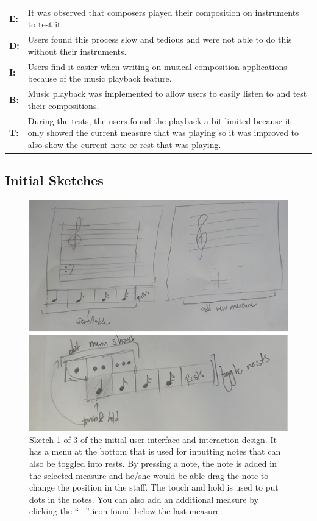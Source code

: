 \begin{table} [H]
\begin{tabular}{|p{2.5cm} p{12.5cm}|}
			  	\textbf{E:} 	& It was observed that composers played their composition on instruments to test it.  \\
			  	\textbf{D:} 	& Users found this process slow and tedious and were not able to do this without their instruments. \\
			  	\textbf{I:} 		& Users find it easier when writing on musical composition applications because of the music playback feature. \\
			  	\textbf{B:} 	& Music playback was implemented to allow users to easily listen to and test their compositions. \\
			  	\textbf{T:} 	& During the tests, the users found the playback a bit limited because it only showed the current measure that was playing so it was improved to also show the current note or rest that was playing. \\
			  	\hline	
			\end{tabular}
		\end{table}



		\subsection{Initial Sketches}

			\begin{figure}[H]
				\centering
				\includegraphics[scale=0.3]{figures/initial-sketches-1.png}
			    \caption{Sketch 1 of 3 of the initial user interface and interaction design. It has a menu at the bottom that is used for inputting notes that can also be toggled into rests. By pressing a note, the note is added in the selected measure and he/she would be able drag the note to change the position in the staff. The touch and hold is used to put dots in the notes. You can also add an additional measure by clicking the ``+'' icon found below the last measure.}
			    \label{fig:initial_sketches_1}
			\end{figure}

